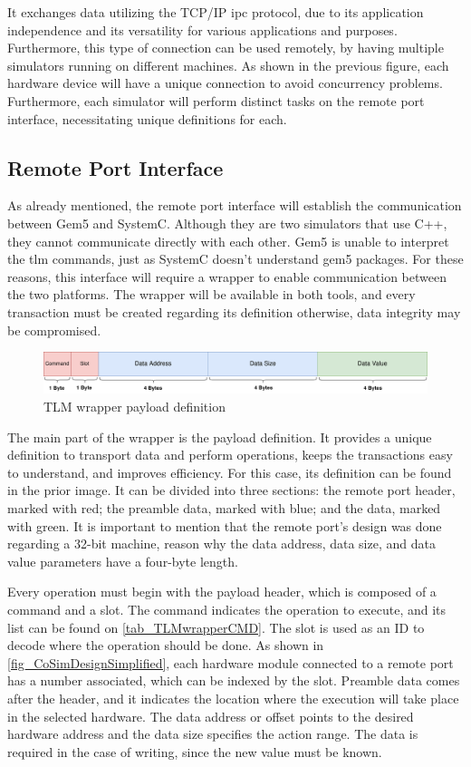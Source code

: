 It exchanges data utilizing the TCP/IP \gls{ipc} protocol, due to its application independence and its versatility for various applications 
and purposes. Furthermore, this type of connection can be used remotely, by having multiple simulators running on different machines.  
As shown in the previous figure, each hardware device will have a unique connection to avoid concurrency problems. Furthermore, each simulator 
will perform distinct tasks on the remote port interface, necessitating unique definitions for each.

\subsection{Remote Port Interface} 
\label{subsec::TLMwrapper}

As already mentioned, the remote port interface will establish the communication between Gem5 and SystemC.
Although they are two simulators that use C++, they cannot communicate directly with each other. Gem5 is unable to 
interpret the \gls{tlm} commands, just as SystemC doesn't understand gem5 packages. For these reasons,
this interface will require a wrapper to enable communication between the two platforms. 
The wrapper will be available in both tools, and every transaction must be created regarding its definition otherwise, 
data integrity may be compromised. 

\begin{figure}[H]
	\centering
 	\includegraphics[width=0.8\linewidth]{Images/TLM_Wrapper_Payload.png} 
 	\caption{TLM wrapper payload definition}
\end{figure}


The main part of the wrapper is the payload definition. It provides a unique definition to transport data and perform operations, 
keeps the transactions easy to understand, and improves efficiency. For this case, its definition can be found in the prior image. 
It can be divided into three sections: the remote port header, marked with red; the preamble data, marked with blue; and the data, marked with green. 
It is important to mention that the remote port's design was done regarding a 32-bit machine, reason why the data address, data size, and data value 
parameters have a four-byte length.

Every operation must begin with the payload header, which is composed of a command and a slot. The command indicates the operation to execute, and
its list can be found on \autoref{tab_TLMwrapperCMD}. The slot is used as an ID to decode where the operation should be done. 
As shown in \autoref{fig_CoSimDesignSimplified}, each hardware module connected to a remote port has a number associated, which can be indexed by 
the slot. Preamble data comes after the header, and it indicates the location where the execution will take place in the selected hardware. 
The data address or offset points to the desired hardware address and the data size specifies the action range. The data is required in 
the case of writing, since the new value must be known. 


